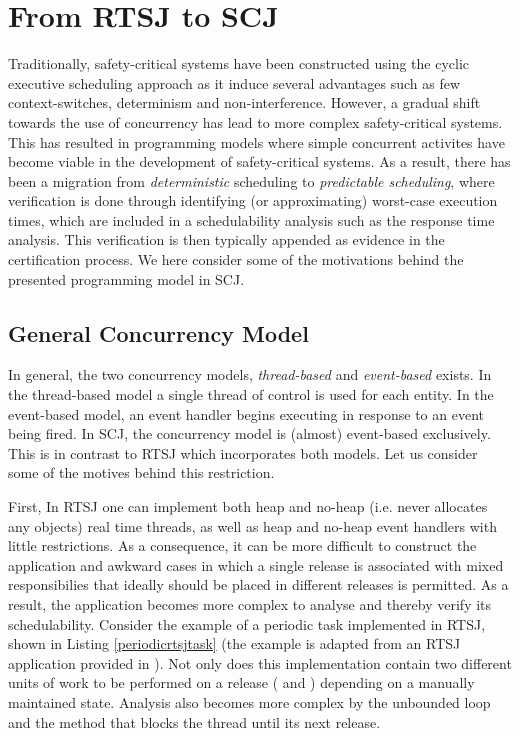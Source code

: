 \section{From RTSJ to SCJ}
\label{section:scjreflecton}
Traditionally, safety-critical systems have been constructed using the cyclic executive scheduling approach as it induce several advantages such as few context-switches, determinism and non-interference\cite{Ravn:2010:CES:1850771.1850779}. However, a gradual shift towards the use of concurrency has lead to more complex safety-critical systems. This has resulted in programming models where simple concurrent activites have become viable in the development of safety-critical systems. As a result, there has been a migration from \textit{deterministic} scheduling to \textit{predictable scheduling}, where verification is done through identifying (or approximating) worst-case execution times, which are included in a schedulability analysis such as the response time analysis. This verification is then typically appended as evidence in the certification process. We here consider some of the motivations behind the presented programming model in SCJ.

\subsection{General Concurrency Model} %
In general, the two concurrency models, \textit{thread-based} and \textit{event-based} exists. In the thread-based model a single thread of control is used for each entity. In the event-based model, an event handler begins executing in response to an event being fired. In SCJ, the concurrency model is (almost) event-based exclusively. This is in contrast to RTSJ which incorporates both models. Let us consider some of the motives behind this restriction.

First, In RTSJ one can implement both heap and no-heap (i.e. never allocates any objects) real time threads, as well as heap and no-heap event handlers with little restrictions. As a consequence, it can be more difficult to construct the application and awkward cases in which a single release is associated with mixed responsibilies that ideally should be placed in different releases is permitted. As a result, the application becomes more complex to analyse and thereby verify its schedulability. Consider the example of a periodic task implemented in RTSJ, shown in Listing \ref{periodicrtsjtask} (the example is adapted from an RTSJ application provided in \cite{Schoeberl:2007:GCS:1288940.1288953}). Not only does this implementation contain two different units of work to be performed on a release ( and ) depending on a manually maintained state. Analysis also becomes more complex by the unbounded loop and the  method that blocks the thread until its next release.


